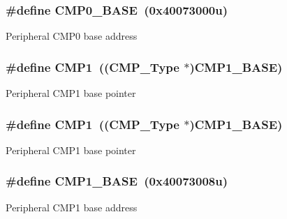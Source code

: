 \subsubsection[{\texorpdfstring{C\+M\+P0\+\_\+\+B\+A\+SE}{CMP0_BASE}}]{\setlength{\rightskip}{0pt plus 5cm}\#define C\+M\+P0\+\_\+\+B\+A\+SE~(0x40073000u)}\hypertarget{group__CMP__Peripheral__Access__Layer_gaa174cde56b35e3d6a74b2a752296c268}{}\label{group__CMP__Peripheral__Access__Layer_gaa174cde56b35e3d6a74b2a752296c268}
Peripheral C\+M\+P0 base address 
\subsubsection[{\texorpdfstring{C\+M\+P1}{CMP1}}]{\setlength{\rightskip}{0pt plus 5cm}\#define C\+M\+P1~(({\bf C\+M\+P\+\_\+\+Type} $\ast$){\bf C\+M\+P1\+\_\+\+B\+A\+SE})}\hypertarget{group__CMP__Peripheral__Access__Layer_ga4feda05828d32e7b657d871ccf105538}{}\label{group__CMP__Peripheral__Access__Layer_ga4feda05828d32e7b657d871ccf105538}
Peripheral C\+M\+P1 base pointer 
\subsubsection[{\texorpdfstring{C\+M\+P1}{CMP1}}]{\setlength{\rightskip}{0pt plus 5cm}\#define C\+M\+P1~(({\bf C\+M\+P\+\_\+\+Type} $\ast$){\bf C\+M\+P1\+\_\+\+B\+A\+SE})}\hypertarget{group__CMP__Peripheral__Access__Layer_ga4feda05828d32e7b657d871ccf105538}{}\label{group__CMP__Peripheral__Access__Layer_ga4feda05828d32e7b657d871ccf105538}
Peripheral C\+M\+P1 base pointer 
\subsubsection[{\texorpdfstring{C\+M\+P1\+\_\+\+B\+A\+SE}{CMP1_BASE}}]{\setlength{\rightskip}{0pt plus 5cm}\#define C\+M\+P1\+\_\+\+B\+A\+SE~(0x40073008u)}\hypertarget{group__CMP__Peripheral__Access__Layer_ga890dc341ab8c2c9f71f9840cda07b9cb}{}\label{group__CMP__Peripheral__Access__Layer_ga890dc341ab8c2c9f71f9840cda07b9cb}
Peripheral C\+M\+P1 base address 
